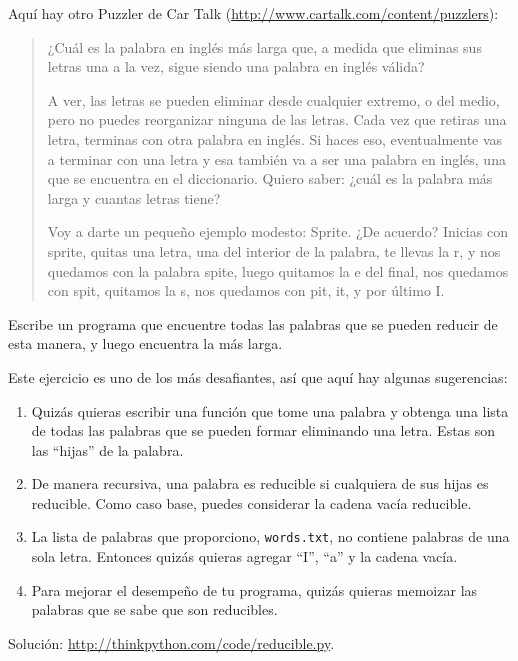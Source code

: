 \documentclass[10pt]{book}
\begin{document}
\begin{exercise}

Aquí hay otro Puzzler de Car Talk
(\url{http://www.cartalk.com/content/puzzlers}):

\begin{quote}
¿Cuál es la palabra en inglés más larga que, a medida que eliminas sus letras
una a la vez, sigue siendo una palabra en inglés válida?

A ver, las letras se pueden eliminar desde cualquier extremo, o del medio, pero
no puedes reorganizar ninguna de las letras. Cada vez que retiras una letra,
terminas con otra palabra en inglés. Si haces eso, eventualmente
vas a terminar con una letra y esa también va a ser una
palabra en inglés, una que se encuentra en el diccionario. Quiero saber:
¿cuál es la palabra más larga y cuantas letras
tiene?

Voy a darte un pequeño ejemplo modesto: Sprite. ¿De acuerdo? Inicias
con sprite, quitas una letra, una del interior de la
palabra, te llevas la r, y nos quedamos con la palabra spite, luego
quitamos la e del final, nos quedamos con spit, quitamos la s, nos
quedamos con pit, it, y por último I.
\end{quote}

Escribe un programa que encuentre todas las palabras que se pueden reducir de
esta manera, y luego encuentra la más larga.

Este ejercicio es uno de los más desafiantes, así que aquí hay
algunas sugerencias:

\begin{enumerate}

\item Quizás quieras escribir una función que tome una palabra y
  obtenga una lista de todas las palabras que se pueden formar eliminando una
  letra.  Estas son las ``hijas'' de la palabra.

\item De manera recursiva, una palabra es reducible si cualquiera de sus hijas
es reducible.  Como caso base, puedes considerar la cadena vacía
reducible.

\item La lista de palabras que proporciono, {\tt words.txt}, no
contiene palabras de una sola letra.  Entonces quizás quieras agregar
``I'', ``a'' y la cadena vacía.

\item Para mejorar el desempeño de tu programa, quizás quieras
memoizar las palabras que se sabe que son reducibles.

\end{enumerate}

Solución: \url{http://thinkpython.com/code/reducible.py}.

\end{exercise}
\end{document}
